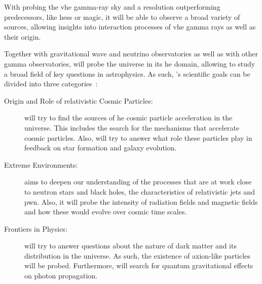 With \cta{} probing the \gls{vhe} gamma-ray sky and a resolution outperforming predecessors, like
\gls{hess} or \gls{magic}, it will be able to observe a broad variety of sources, allowing insights
into interaction processes of \gls{vhe} gamma rays as well as their origin.

Together with gravitational wave and neutrino observatories as well as with other gamma observatories,
\cta{} will probe the universe in its \gls{he} domain, allowing to study a broad field of key questions
in astrophysics. As such, \cta's scientific goals can be divided into three categories~\cite{cta_scientific_goals}:
\begin{description}
    \item [Origin and Role of relativistic Cosmic Particles:] \cta{} will try to find the sources of
    \gls{he} cosmic particle acceleration in the universe. This includes the search for the mechanisms
    that accelerate cosmic particles. Also, \cta{} will try to answer what role these particles play
    in feedback on star formation and galaxy evolution.
    \item [Extreme Environments:] \cta{} aims to deepen our understanding of the processes that
    are at work close to neutron stars and black holes, the characteristics of relativistic jets and
    \gls{pwn}. Also, it will probe the intensity of radiation fields and magnetic fields and how these
    would evolve over cosmic time scales.
    \item [Frontiers in Physics:] \cta{} will try to answer questions about the nature of dark matter
    and its distribution in the universe. As such, the existence of axion-like particles will be
    probed. Furthermore, \cta{} will search for quantum gravitational effects on photon propagation.
\end{description}

